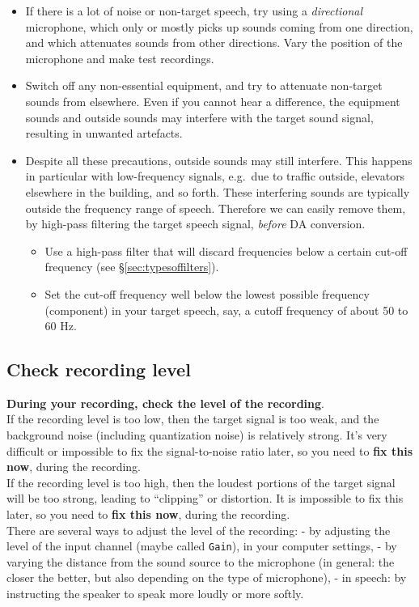 \documentclass[
]{book}
\providecommand{\tightlist}{%
  \setlength{\itemsep}{0pt}\setlength{\parskip}{0pt}}
\begin{document}
\begin{itemize}
\item
  If there is a lot of noise or non-target speech, try using a \emph{directional} microphone, which only or mostly picks up sounds coming from one direction, and which attenuates sounds from other directions. Vary the position of the microphone and make test recordings.
\item
  Switch off any non-essential equipment, and try to attenuate non-target sounds from elsewhere. Even if you cannot hear a difference, the equipment sounds and outside sounds may interfere with the target sound signal, resulting in unwanted artefacts.
\item
  Despite all these precautions, outside sounds may still interfere. This happens in particular with low-frequency signals, e.g.~due to traffic outside, elevators elsewhere in the building, and so forth. These interfering sounds are typically outside the frequency range of speech. Therefore we can easily remove them, by high-pass filtering the target speech signal, \emph{before} DA conversion.

  \begin{itemize}
  \tightlist
  \item
    Use a high-pass filter that will discard frequencies below a certain cut-off frequency (see §\ref{sec:typesoffilters}).
  \item
    Set the cut-off frequency well below the lowest possible frequency (component) in your target speech, say, a cutoff frequency of about 50 to 60 Hz.
  \end{itemize}
\end{itemize}

\subsection{Check recording level}\label{sec:recordinglevel}

\textbf{During your recording, check the level of the recording}.\\
If the recording level is too low, then the target signal is too weak, and the background noise (including quantization noise) is relatively strong. It's very difficult or impossible to fix the signal-to-noise ratio later, so you need to \textbf{fix this now}, during the recording.\\
If the recording level is too high, then the loudest portions of the target signal will be too strong, leading to ``clipping'' or distortion. It is impossible to fix this later, so you need to \textbf{fix this now}, during the recording.\\
There are several ways to adjust the level of the recording:
- by adjusting the level of the input channel (maybe called \texttt{Gain}), in your computer settings,
- by varying the distance from the sound source to the microphone (in general: the closer the better, but also depending on the type of microphone),
- in speech: by instructing the speaker to speak more loudly or more softly.
\end{document}
